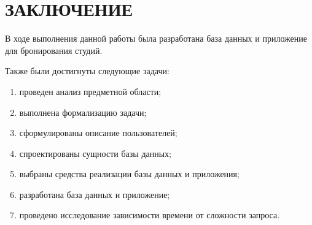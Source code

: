 \chapter*{ЗАКЛЮЧЕНИЕ}
 В ходе выполнения данной работы была разработана база данных и приложение для бронирования студий.
 
 Также были достигнуты следующие задачи:
\begin{enumerate}
	\item проведен анализ предметной области;
	\item выполнена формализацию задачи;
	\item сформулированы описание пользователей;
	\item спроектированы сущности базы данных;
	\item выбраны средства реализации базы данных и приложения;
	\item разработана база данных и приложение;
	\item проведено исследование зависимости времени от сложности запроса.
\end{enumerate}